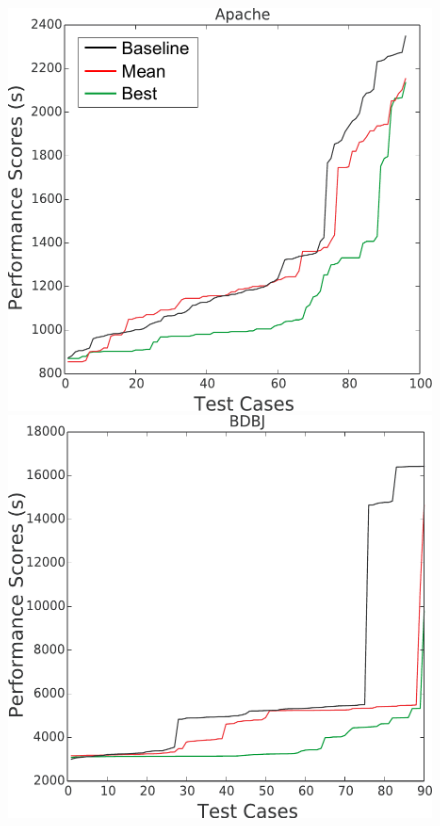 \documentclass[conference]{IEEEtran}
\begin{document}
 \begin{figure}[htbp!]
\centering
\begin{minipage}{0.30\linewidth}
\includegraphics[width=\linewidth]{figs/Apache.pdf}
\end{minipage}
\begin{minipage}{0.30\linewidth}
\includegraphics[width=\linewidth]{figs/BDBJ.pdf}

\end{minipage}
\end{figure}
\end{document}

